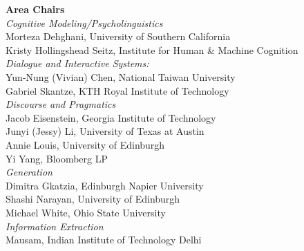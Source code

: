 {\bf Area Chairs} \\
                \emph{Cognitive Modeling/Psycholinguistics} \\
                                    \hspace*{0.2in} Morteza Dehghani, University of Southern California \\
                                    \hspace*{0.2in} Kristy Hollingshead Seitz, Institute for Human & Machine Cognition \\
                            \emph{Dialogue and Interactive Systems:} \\
                                    \hspace*{0.2in} Yun-Nung (Vivian) Chen, National Taiwan University \\
                                    \hspace*{0.2in} Gabriel Skantze, KTH Royal Institute of Technology \\
                            \emph{Discourse and Pragmatics} \\
                                    \hspace*{0.2in} Jacob Eisenstein, Georgia Institute of Technology \\
                                    \hspace*{0.2in} Junyi (Jessy) Li, University of Texas at Austin \\
                                    \hspace*{0.2in} Annie Louis, University of Edinburgh \\
                                    \hspace*{0.2in} Yi Yang, Bloomberg LP \\
                            \emph{Generation} \\
                                    \hspace*{0.2in} Dimitra Gkatzia, Edinburgh Napier University \\
                                    \hspace*{0.2in} Shashi Narayan, University of Edinburgh \\
                                    \hspace*{0.2in} Michael White, Ohio State University \\
                            \emph{Information Extraction} \\
                                    \hspace*{0.2in} Mausam, Indian Institute of Technology Delhi \\
